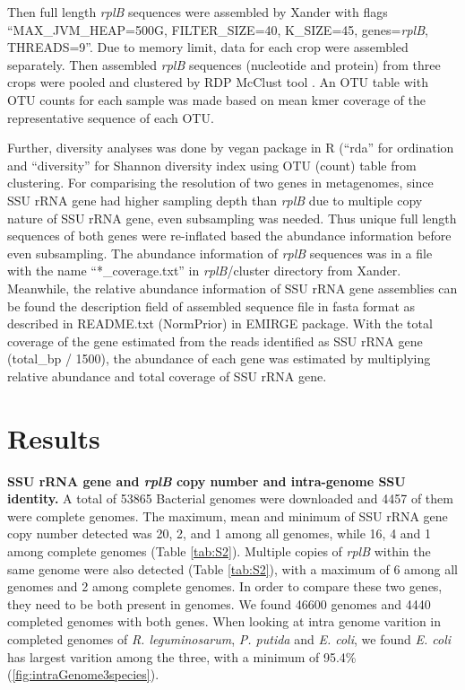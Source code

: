 \documentclass[]{msu-thesis}
\begin{document}
Then full length \textit{rplB} sequences were assembled by Xander with flags 
``MAX\_JVM\_HEAP=500G, FILTER\_SIZE=40, K\_SIZE=45, genes=\textit{rplB}, THREADS=9''. 
Due to memory limit, data for each crop were assembled separately. Then assembled \textit{rplB} sequences (nucleotide and protein) from three crops were pooled and clustered by RDP McClust tool \cite{cole_ribosomal_2014}. An OTU table with OTU counts for each sample was made based on mean kmer coverage of the representative sequence of each OTU. 

Further, diversity analyses was done by vegan package in R (``rda'' for ordination and ``diversity'' for Shannon diversity index using OTU (count) table from clustering. For comparising the resolution of two genes in metagenomes, since SSU rRNA gene had higher sampling depth than \textit{rplB} due to multiple copy nature of SSU rRNA gene, even subsampling was needed. Thus unique full length sequences of both genes were re-inflated based the abundance information before even subsampling. The abundance information of \textit{rplB} sequences was in a file with the name ``*\_coverage.txt'' in \textit{rplB}/cluster directory from Xander. Meanwhile, the relative abundance information of SSU rRNA gene assemblies can be found the description field of assembled sequence file in fasta format as described in README.txt (NormPrior) in EMIRGE package. With the total coverage of the gene estimated from the reads identified as SSU rRNA gene (total\_bp / 1500), the abundance of each gene was estimated by multiplying relative abundance and total coverage of SSU rRNA gene.

\section{Results}

\textbf{SSU rRNA gene and \textit{rplB} copy number and intra-genome SSU identity. }
A total of 53865 Bacterial genomes were downloaded and 4457 of them were complete genomes. The maximum, mean and minimum of SSU rRNA gene copy number detected was 20, 2, and 1 among all genomes, while 16, 4 and 1 among complete genomes (Table \ref{tab:S2}). Multiple copies of \textit{rplB} within the same genome were also detected (Table \ref{tab:S2}), with a maximum of 6 among all genomes and 2 among complete genomes. In order to compare these two genes, they need to be both present in genomes. We found 46600 genomes and 4440 completed genomes with both genes. When looking at intra genome varition in completed genomes of \textit{R. leguminosarum}, \textit{P. putida} and \textit{E. coli}, we found \textit{E. coli} has largest varition among the three, with a minimum of 95.4\% (\cref{fig:intraGenome3species}).
\end{document}
